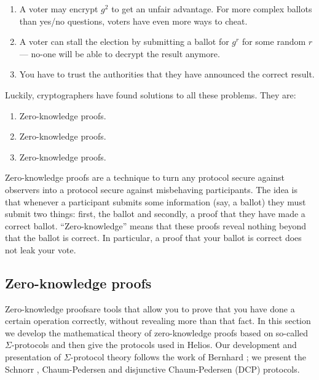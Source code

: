 \documentclass[envcountsame]{llncs}
\begin{document}
\begin{enumerate}
\item A voter may encrypt $g^2$ to get an unfair advantage. For more complex ballots than yes/no questions, voters have even more ways to cheat.
\item A voter can stall the election by submitting a ballot for $g^r$ for some
random $r$ --- no-one will be able to decrypt the result anymore.
\item You have to trust the authorities that they have announced the correct
result.
\end{enumerate}

Luckily, cryptographers have found solutions to all these problems. They are:
\begin{enumerate}
\item Zero-knowledge proofs.
\item Zero-knowledge proofs.
\item Zero-knowledge proofs.
\end{enumerate}

Zero-knowledge proofs are a technique to turn any protocol secure against
observers into a protocol secure against misbehaving participants. The idea is
that whenever a participant submits some information (say, a ballot) they must
submit two things: first, the ballot and secondly, a proof that they have made a
correct ballot. ``Zero-knowledge'' means that these proofs reveal nothing
beyond that the ballot is correct. In particular, a proof that your ballot is
correct does not leak your vote.

\subsection{Zero-knowledge proofs}

Zero-knowledge proofs\footnotemark are tools that allow you to prove that you
have done a certain operation correctly, without revealing more than that fact.
In this section we develop the mathematical theory of zero-knowledge proofs
based on so-called $\Sigma$-protocols and then give the protocols used in
Helios. Our development and presentation of $\Sigma$-protocol theory follows the
work of Bernhard \cite{B14}; we present the Schnorr \cite{S91},
Chaum-Pedersen \cite{CP92} and disjunctive Chaum-Pedersen (DCP) protocols.
\end{document}
